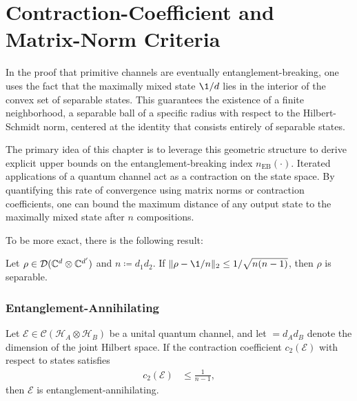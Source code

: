 \section{Contraction-Coefficient and Matrix-Norm Criteria}\label{sec:result:contraction}
In the proof that primitive channels are eventually entanglement-breaking, one uses the fact that the maximally mixed state ${\1}/{d}$ lies in the interior of the convex set of separable states. This guarantees the existence of a finite neighborhood, a separable ball of a specific radius with respect to the Hilbert-Schmidt norm, centered at the identity that consists entirely of separable states. 

The primary idea of this chapter is to leverage this geometric structure to derive explicit upper bounds on the entanglement-breaking index $n_{\text{EB}}(\cdot)$. Iterated applications of a quantum channel act as a contraction on the state space. By quantifying this rate of convergence using matrix norms or contraction coefficients, one can bound the maximum distance of any output state to the maximally mixed state after $n$ compositions.

To be more exact, there is the following result:
\begin{prop}\label{prop:ball}
    Let $\rho \in \mathcal D(\mathbb{C}^d\otimes \mathbb{C}^{d'})$ and $n\coloneqq d_1 d_2$. If $\norm{\rho - \1/n}_2 \leq 1/\sqrt{n(n-1)}$, then $\rho$ is separable.
\end{prop}
\subsubsection{Entanglement-Annihilating}
\begin{prop}
Let $\mathcal{E} \in \mathcal{C}(\mathcal{H}_A \otimes \mathcal{H}_B)$ be a unital quantum channel, and let $ = d_A d_B$ denote the dimension of the joint Hilbert space. If the contraction coefficient $c_2(\mathcal{E})$ with respect to states satisfies
\begin{align*}
    c_2(\mathcal{E}) &\le \frac{1}{n - 1},
\end{align*}
then $\mathcal{E}$ is entanglement-annihilating.
\end{prop}

